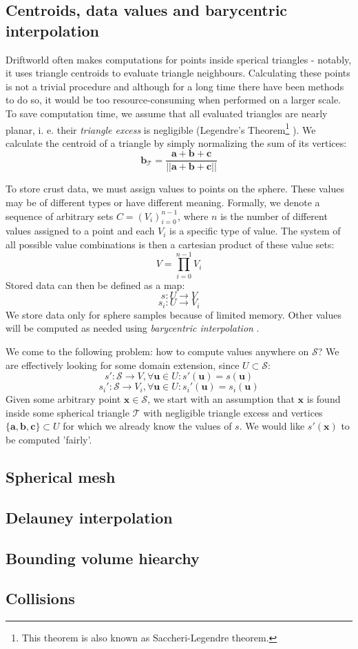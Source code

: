 \subsection{Centroids, data values and barycentric interpolation}
Driftworld often makes computations for points inside sperical triangles - notably, it uses triangle centroids to evaluate triangle neighbours. Calculating these points is not a trivial procedure and although for a long time there have been methods to do so, it would be too resource-consuming when performed on a larger scale. To save computation time, we assume that all evaluated triangles are nearly planar, i. e. their \textit{triangle excess} is negligible (Legendre's Theorem\footnote{This theorem is also known as Saccheri-Legendre theorem.} \cite{todhunter}). We calculate the centroid of a triangle by simply normalizing the sum of its vertices:
$$\mathbf{b}_\mathcal{T}=\frac{\mathbf{a} + \mathbf{b} + \mathbf{c}}{||\mathbf{a} + \mathbf{b} + \mathbf{c}||}$$

To store crust data, we must assign values to points on the sphere. These values may be of different types or have different meaning. Formally, we denote a sequence of arbitrary sets $C=\left(V_i\right)_{i=0}^{n-1}$, where $n$ is the number of different values assigned to a point and each $V_i$ is a specific type of value. The system of all possible value combinations is then a cartesian product of these value sets:
$$V=\prod_{i=0}^{n-1}V_i$$
Stored data can then be defined as a map:
$$s: U\rightarrow V$$
$$s_i: U\rightarrow V_i$$
We store data only for sphere samples because of limited memory. Other values will be computed as needed using \textit{barycentric interpolation} \cite{scratchapixel}.

We come to the following problem: how to compute values anywhere on $\mathcal{S}$? We are effectively looking for some domain extension, since $U\subset\mathcal{S}$:
$$s':\mathcal{S}\rightarrow V, \forall \mathbf{u}\in U:s'(\mathbf{u})=s(\mathbf{u})$$
$$s_i':\mathcal{S}\rightarrow V_i, \forall \mathbf{u}\in U:s_i'(\mathbf{u})=s_i(\mathbf{u})$$
Given some arbitrary point $\mathbf{x}\in\mathcal{S}$, we start with an assumption that $\mathbf{x}$ is found inside some spherical triangle $\mathcal{T}$ with negligible triangle excess and vertices $\{\mathbf{a}, \mathbf{b}, \mathbf{c}\} \subset U$ for which we already know the values of $s$. We would like $s'(\mathbf{x})$ to be computed 'fairly'.
\subsection{Spherical mesh}
\subsection{Delauney interpolation}
\subsection{Bounding volume hiearchy}
\subsection{Collisions}

